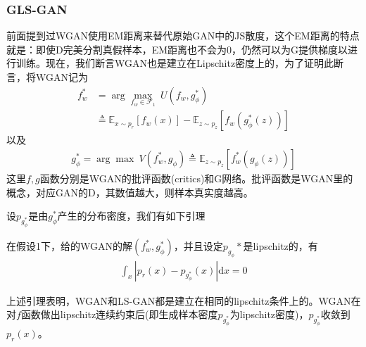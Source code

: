         \subsubsection{GLS-GAN}
            \par
            前面提到过WGAN使用EM距离来替代原始GAN中的JS散度，这个EM距离的特点就是：即使D完美分割真假样本，EM距离也不会为0，仍然可以为G提供梯度以进行训练。现在，我们断言WGAN也是建立在Lipschitz密度上的，为了证明此断言，将WGAN记为
            \begin{align*}
            f_w^* & = \arg\max_{f_w\in \mathcal{F}_1} \ U(f_w,g_\phi^*)\\
            & \triangleq \mathbb{E}_{x\sim p_r}[f_w(x)] - \mathbb{E}_{z\sim p_z}[f_w(g_\phi^*(z))]
            \end{align*}
            以及
            \begin{align*}
            g_\phi^* = \arg\max \ V(f_w^*,g_\phi) \triangleq \mathbb{E}_{z\sim p_z}[f_w^*(g_\phi(z))]
            \end{align*}
            这里$f,g$函数分别是WGAN的批评函数(critics)和G网络。批评函数是WGAN里的概念，对应GAN的D，其数值越大，则样本真实度越高。
            \par
            设$p_{g_\phi^*}$是由$g_\phi^*$产生的分布密度，我们有如下引理
            \begin{lemma}[3]
            在假设1下，给的WGAN的解$(f_w^*,g_\phi^*)$，并且设定$p_{g_\phi}*$是lipschitz的，有
            \begin{align*}
            \int _x |p_r(x) - p_{g_\phi^*}(x)|\mathrm{d}x = 0
            \end{align*}
            \end{lemma}
            \par
            上述引理表明，WGAN和LS-GAN都是建立在相同的lipschitz条件上的。WGAN在对$f$函数做出lipschitz连续约束后(即生成样本密度$p_{g_\phi^*}$为lipschitz密度)，$p_{g_\phi^*}$收敛到$p_r(x)$。
